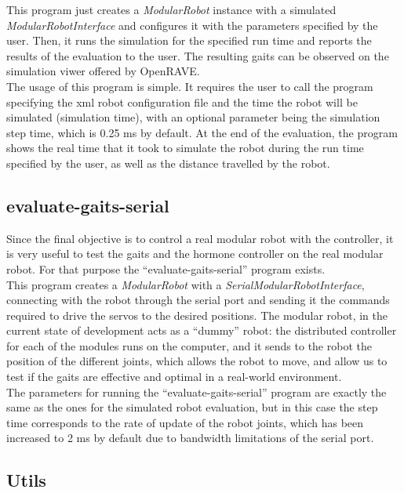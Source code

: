 This program just creates a \emph{ModularRobot} instance with a simulated \emph{ModularRobotInterface} and configures it with the parameters specified by the user. Then, it runs the simulation for the specified run time and reports the results of the evaluation to the user. The resulting gaits can be observed on the simulation viwer offered by OpenRAVE.\\

The usage of this program is simple. It requires the user to call the program specifying the xml robot configuration file and the time the robot will be simulated (simulation time), with an optional parameter being the simulation step time, which  is 0.25 ms by default. At the end of the evaluation, the program shows the real time that it took to simulate the robot during the run time specified by the user, as well as the distance travelled by the robot.\\


\subsection{evaluate-gaits-serial}
\label{software_evaluate-gaits-serial}
Since the final objective is to control a real modular robot with the controller, it is very useful to test the gaits and the hormone controller on the real modular robot. For that purpose the ``evaluate-gaits-serial'' program exists.\\

This program creates a \emph{ModularRobot} with a \emph{SerialModularRobotInterface}, connecting with the robot through the serial port and sending it the commands required to drive the servos to the desired positions. The modular robot, in the current state of development acts as a ``dummy'' robot: the distributed controller for each of the modules runs on the computer, and it sends to the robot the position of the different joints, which allows the robot to move, and allow us to test if the gaits are effective and optimal in a real-world environment.\\

The parameters for running the ``evaluate-gaits-serial'' program are exactly the same as the ones for the simulated robot evaluation, but in this case the step time corresponds to the rate of update of the robot joints, which has been increased to 2 ms by default due to bandwidth limitations of the serial port.\\


\subsection{Utils}
\label{software_utils}

